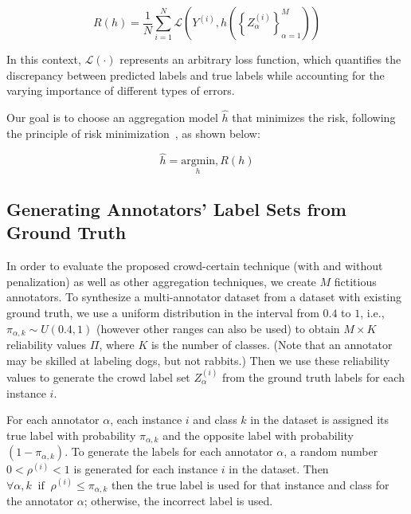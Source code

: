 \documentclass[pdflatex,bst/sn-basic]{bst/sn-jnl}%
\begin{document}
\begin{equation}
R(h) = \frac{1}{N} \sum_{i=1}^{N} \mathcal{L} \left( Y^{(i)}, h\left(\left\{Z_{\alpha}^{(i)}\right\}_{\alpha=1}^{M}\right)\right)
\label{crowd.Eq.2.risk.emp}
\end{equation}

In this context, $\mathcal{L}(\cdot) $ represents an arbitrary loss function, which quantifies the discrepancy between predicted labels and true labels while accounting for the varying importance of different types of errors.

Our goal is to choose an aggregation model $\widehat{h} $ that minimizes the risk, following the principle of risk minimization~\cite{vapnik_Principles_1991}, as shown below:

\begin{equation}
\widehat{h} = \underset{h}{\text{argmin}} , R(h)
\label{crowd.Eq.3.risk.h}
\end{equation}


\subsection{Generating Annotators’  Label Sets from Ground Truth}

In order to evaluate the proposed crowd-certain technique  (with and without penalization) as well as other aggregation techniques, we create $M$ fictitious annotators. To synthesize a multi-annotator dataset from a dataset with existing ground truth, we use a uniform distribution in the interval from $0.4 $ to $1 $, i.e., $\pi_{\alpha,k}\sim U\left(0.4,1\right) $ (however other ranges can also be used) to obtain $M \times  K$ reliability values $\Pi $, where $K$ is the number of classes. (Note that
an annotator may be skilled at labeling dogs, but not rabbits.) Then we use these reliability values to generate the crowd label set $Z_{\alpha}^{(i)} $ from the ground truth labels for each instance $i $.

For each annotator $\alpha $, each instance $i $ and class $k $ in the dataset is assigned its true label with probability $\pi_{\alpha,k} $ and the opposite label with probability $ (1-\pi_{\alpha,k}) $. To generate the labels for each annotator $\alpha $, a random number $0 < \rho^{(i)} < 1 $ is generated for each instance $i $ in the dataset. Then $\forall \alpha,k \; \; \text{if} \; \; \rho^{(i)}\leq \pi_{\alpha,k} $ then the true label is used for that instance and class for the annotator $\alpha $; otherwise, the incorrect label is used.
\end{document}
